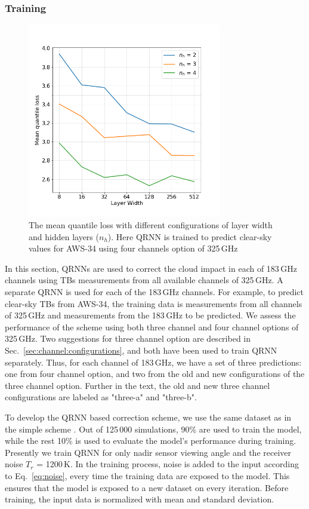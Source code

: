 \documentclass[12pt]{article}
\begin{document}
\subsubsection{Training}
%  
\label{sec:qrnn:training}
\begin{figure}[!tb]
	\centering
	\includegraphics[height=85mm]{quantile_loss.png}
	\caption{The mean quantile loss with different configurations of layer width and hidden layers ($n_h$). Here QRNN is trained to predict clear-sky values for AWS-34 using four channels option of 325\,GHz}
	\label{fig:quantile_loss}
\end{figure}
In this section, QRNNs are used to correct the cloud impact in each of 183\,GHz channels using TBs measurements from all available channels of 325\,GHz. A separate QRNN is used for each of the 183\,GHz channels. For example, to predict clear-sky TBs from AWS-34, the training data is measurements from all channels of 325\,GHz and measurements from the 183\,GHz to be predicted. We assess the performance of the scheme using both three channel and four channel options of 325\,GHz. Two suggestions for three channel option are described in Sec.~\ref{sec:channel:configurations}, and both have been used to train QRNN separately. Thus, for each channel of 183\,GHz, we have a set of three predictions: one from four channel option, and two from the old and new configurations of the three channel option. Further in the text, the old and new three channel configurations are labeled as "three-a" and "three-b".

To develop the QRNN based correction scheme, we use the same dataset as in the
simple scheme . Out of 125\,000 simulations, 90\% are used to train the model,
while the rest 10\% is used to evaluate the model's performance during
training. Presently we train QRNN for only nadir sensor viewing angle and the
receiver noise $T_r$ = 1200\,K. In the training process, noise is added to the
input according to Eq.~\ref{eq:noise}, every time the training data are exposed
to the model. This ensures that the model is exposed to a new dataset on every
iteration. Before training, the input data is normalized with mean and standard
deviation.
\end{document}
